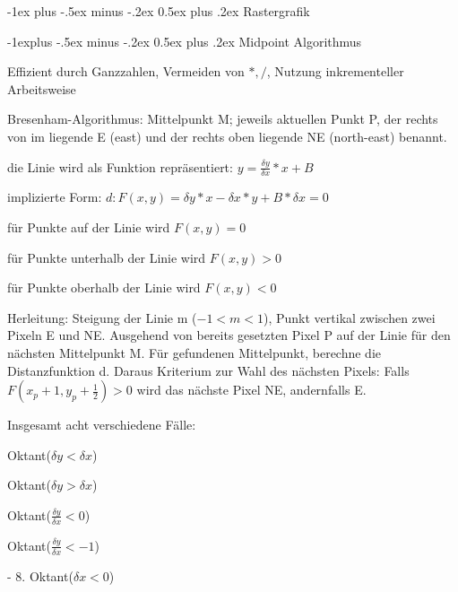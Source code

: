 \documentclass[landscape]{article}
\makeatletter
\renewcommand{\section}{\@startsection{section}{1}{0mm}%
                                {-1ex plus -.5ex minus -.2ex}%
                                {0.5ex plus .2ex}%
                                {\normalfont\large\bfseries}}
\renewcommand{\subsection}{\@startsection{subsection}{2}{0mm}%
                                {-1explus -.5ex minus -.2ex}%
                                {0.5ex plus .2ex}%
                                {\normalfont\normalsize\bfseries}}
\makeatother
\begin{document}
\begin{multicols}{3}
  \section{Rastergrafik}
  
  \subsection{ Midpoint Algorithmus}
  \begin{itemize*}
    \item Effizient durch Ganzzahlen, Vermeiden von $*,/$, Nutzung inkrementeller Arbeitsweise
    \item Bresenham-Algorithmus: Mittelpunkt M; jeweils aktuellen Punkt P, der rechts von im liegende E (east) und der rechts oben liegende NE (north-east) benannt.
    \item die Linie wird als Funktion repräsentiert: $y=\frac{\delta y}{\delta x}*x+B$
    \item implizierte Form: $d: F(x,y)=\delta y*x-\delta x*y+B*\delta x = 0$
    \item für Punkte auf der Linie wird $F(x,y)=0$
    \item für Punkte unterhalb der Linie wird $F(x,y)>0$
    \item für Punkte oberhalb der Linie wird $F(x,y)<0$
    \item Herleitung: Steigung der Linie m ($-1<m<1$), Punkt vertikal zwischen zwei Pixeln E und NE. Ausgehend von bereits gesetzten Pixel P auf der Linie für den nächsten Mittelpunkt M. Für gefundenen Mittelpunkt, berechne die Distanzfunktion d. Daraus Kriterium zur Wahl des nächsten Pixels: Falls $F(x_p + 1, y_p+\frac{1}{2})>0$ wird das nächste Pixel NE, andernfalls E.
    \item Insgesamt acht verschiedene Fälle:
    \begin{enumerate*}
      \item Oktant($\delta y < \delta x$)
      \item Oktant($\delta y > \delta x$)
      \item Oktant($\frac{\delta y}{\delta x}<  0$)
      \item Oktant($\frac{\delta y}{\delta x}< -1$)
      \item - 8. Oktant($\delta x < 0$)
    \end{enumerate*}
  \end{itemize*}
  

\end{multicols}
\end{document}
